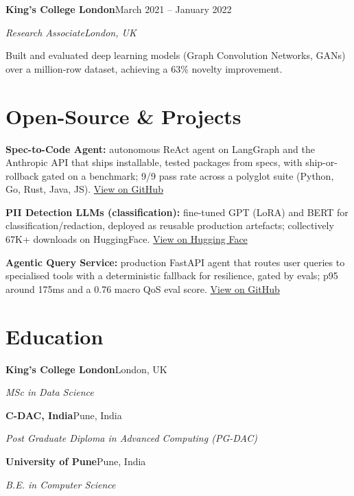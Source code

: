 \documentclass[10pt,a4paper]{article}
\newcommand{\entry}[4]{%
  {\color{company}\bfseries #1}\hfill {\color{muted}#2}\par
  \vspace{1pt}
  {\itshape #3}\hfill {\color{muted}\itshape #4}\par
  \vspace{3pt}%
}
\begin{document}
\entry{King's College London}{March 2021 -- January 2022}{Research Associate}{London, UK}
\begin{tight}
  \item Built and evaluated deep learning models (Graph Convolution Networks, GANs) over a million-row dataset, achieving a 63\% novelty improvement.
\end{tight}

\section{Open-Source \& Projects}
\begin{tight}
  \item \textbf{Spec-to-Code Agent:} autonomous ReAct agent on LangGraph and the Anthropic API that ships installable, tested packages from specs, with ship-or-rollback gated on a benchmark; 9/9 pass rate across a polyglot suite (Python, Go, Rust, Java, JS). \href{https://github.com/abhijeetscode/Spec-to-Code-Agent}{View on GitHub}
  \item \textbf{PII Detection LLMs (classification):} fine-tuned GPT (LoRA) and BERT for classification/redaction, deployed as reusable production artefacts; collectively 67K+ downloads on HuggingFace. \href{https://huggingface.co/ab-ai/pii_model}{View on Hugging Face}
  \item \textbf{Agentic Query Service:} production FastAPI agent that routes user queries to specialised tools with a deterministic fallback for resilience, gated by evals; p95 around 175ms and a 0.76 macro QoS eval score. \href{https://github.com/abhijeetscode/search-agent}{View on GitHub}
\end{tight}

\section{Education}
{\color{company}\bfseries King's College London}\hfill {\color{muted}London, UK}\par
{\itshape MSc in Data Science}\par\vspace{2pt}
{\color{company}\bfseries C-DAC, India}\hfill {\color{muted}Pune, India}\par
{\itshape Post Graduate Diploma in Advanced Computing (PG-DAC)}\par\vspace{2pt}
{\color{company}\bfseries University of Pune}\hfill {\color{muted}Pune, India}\par
{\itshape B.E. in Computer Science}\par
\end{document}
